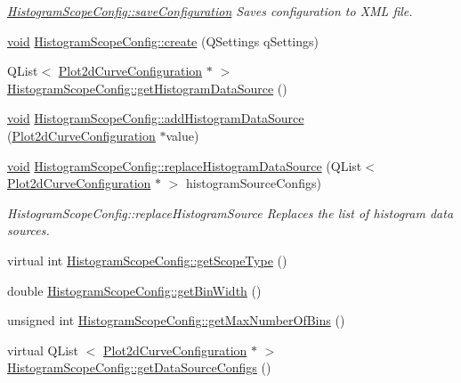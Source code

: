 \begin{DoxyCompactItemize}
\begin{DoxyCompactList}\small\item\em \hyperlink{group___scope_plugin_ga08dd5f7ac27b067ed6eddc9e645bce45}{\-Histogram\-Scope\-Config\-::save\-Configuration} \-Saves configuration to \-X\-M\-L file. \end{DoxyCompactList}\item 
\hyperlink{group___u_a_v_objects_plugin_ga444cf2ff3f0ecbe028adce838d373f5c}{void} \hyperlink{group___scope_plugin_ga23b4c258bf17b6bc16c3dc75ea7d98eb}{\-Histogram\-Scope\-Config\-::create} (\-Q\-Settings q\-Settings)
\item 
\-Q\-List$<$ \hyperlink{struct_plot2d_curve_configuration}{\-Plot2d\-Curve\-Configuration} $\ast$ $>$ \hyperlink{group___scope_plugin_gac01f208b6d79e28b2f148abc13d6b0b9}{\-Histogram\-Scope\-Config\-::get\-Histogram\-Data\-Source} ()
\item 
\hyperlink{group___u_a_v_objects_plugin_ga444cf2ff3f0ecbe028adce838d373f5c}{void} \hyperlink{group___scope_plugin_ga2092a20c3f43c9eb68d370e7dc98cd2b}{\-Histogram\-Scope\-Config\-::add\-Histogram\-Data\-Source} (\hyperlink{struct_plot2d_curve_configuration}{\-Plot2d\-Curve\-Configuration} $\ast$value)
\item 
\hyperlink{group___u_a_v_objects_plugin_ga444cf2ff3f0ecbe028adce838d373f5c}{void} \hyperlink{group___scope_plugin_gaa036bf883eaa724bb577ee9de902dce1}{\-Histogram\-Scope\-Config\-::replace\-Histogram\-Data\-Source} (\-Q\-List$<$ \hyperlink{struct_plot2d_curve_configuration}{\-Plot2d\-Curve\-Configuration} $\ast$ $>$ histogram\-Source\-Configs)
\begin{DoxyCompactList}\small\item\em \-Histogram\-Scope\-Config\-::replace\-Histogram\-Source \-Replaces the list of histogram data sources. \end{DoxyCompactList}\item 
virtual int \hyperlink{group___scope_plugin_ga232680e8671b7a4e205a11f5f164aa1a}{\-Histogram\-Scope\-Config\-::get\-Scope\-Type} ()
\item 
double \hyperlink{group___scope_plugin_gac7c220940b1b3c4c51997623b0268f3d}{\-Histogram\-Scope\-Config\-::get\-Bin\-Width} ()
\item 
unsigned int \hyperlink{group___scope_plugin_ga4b72da75ea27852393740b47bf6f6ae5}{\-Histogram\-Scope\-Config\-::get\-Max\-Number\-Of\-Bins} ()
\item 
virtual \-Q\-List\*
$<$ \hyperlink{struct_plot2d_curve_configuration}{\-Plot2d\-Curve\-Configuration} $\ast$ $>$ \hyperlink{group___scope_plugin_ga79e96fd6c2de93da275c9d1b3c568e95}{\-Histogram\-Scope\-Config\-::get\-Data\-Source\-Configs} ()

\end{DoxyCompactItemize}
